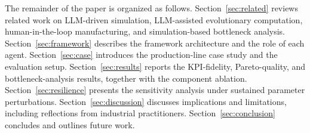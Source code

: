 \documentclass[a4paper,fleqn]{cas-sc}
\newcommand{\NUM}[1]{\textcolor{blue}{#1}}
\begin{document}

                                                                                                                       
The remainder of the paper is organized as follows. Section~\ref{sec:related} reviews related work on LLM-driven simulation, LLM-assisted evolutionary computation, human-in-the-loop manufacturing, and simulation-based bottleneck analysis. Section~\ref{sec:framework} describes the framework architecture and the role of each agent. Section~\ref{sec:case} introduces the production-line case study and the evaluation setup. Section~\ref{sec:results} reports the  KPI-fidelity, Pareto-quality, and bottleneck-analysis results, together with the component ablation. Section~\ref{sec:resilience} presents the sensitivity analysis under sustained parameter perturbations. Section~\ref{sec:discussion} discusses implications and limitations, including reflections from industrial practitioners.               Section~\ref{sec:conclusion} concludes and outlines future work.
\end{document}
